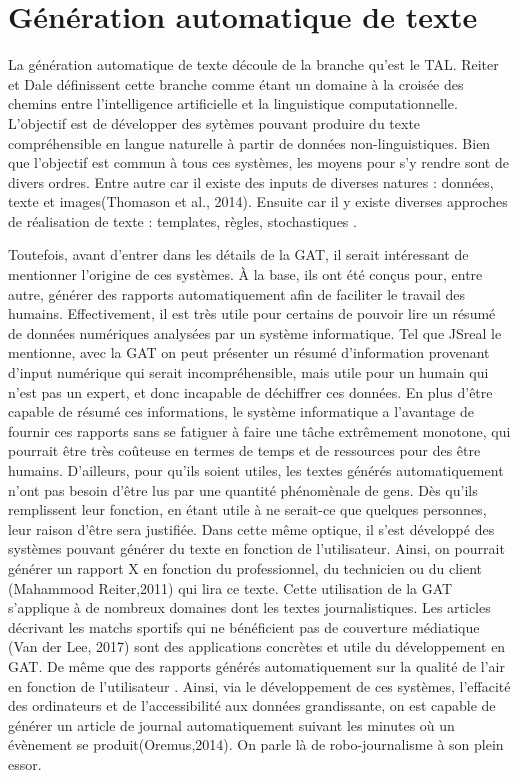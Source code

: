 
\chapter{Génération automatique de texte}

La génération automatique de texte découle de la branche qu'est le \ac{TAL}. Reiter et Dale \citep{ReiterBuildingNaturalLanguage2000} définissent cette branche comme étant un domaine à la croisée des chemins entre l'intelligence artificielle et la linguistique computationnelle. L'objectif est de développer des sytèmes pouvant produire du texte compréhensible en langue naturelle à partir de données non-linguistiques. Bien que l'objectif est commun à tous ces systèmes, les moyens pour s'y rendre sont de divers ordres. Entre autre car il existe des inputs de diverses natures : données, texte et images(Thomason et al., 2014). Ensuite car il y existe diverses approches de réalisation de texte : templates, règles, stochastiques \citep{gatt18}.

Toutefois, avant d'entrer dans les détails de la \ac{GAT}, il serait intéressant de mentionner l'origine de ces systèmes. À la base, ils ont été conçus pour, entre autre, générer des rapports automatiquement afin de faciliter le travail des humains. Effectivement, il est très utile pour certains de pouvoir lire un résumé de données numériques analysées par un système informatique. Tel que JSreal le mentionne, avec la GAT on peut présenter un résumé d'information provenant d'input numérique qui serait incompréhensible, mais utile pour un humain qui n'est pas un expert, et donc incapable de déchiffrer ces données. En plus d'être capable de résumé ces informations, le système informatique a l'avantage de fournir ces rapports sans se fatiguer à faire une tâche extrêmement monotone, qui pourrait être très coûteuse en termes de temps et de ressources pour des être humains.  D'ailleurs, pour qu'ils soient utiles, les textes générés automatiquement n'ont pas besoin d'être lus par une quantité phénomènale de gens. Dès qu'ils remplissent leur fonction, en étant utile à ne serait-ce que quelques personnes, leur raison d'être sera justifiée.  Dans cette même optique, il s'est développé des systèmes pouvant générer du texte en fonction de l'utilisateur. Ainsi, on pourrait générer un rapport X en fonction du professionnel, du technicien ou du client (Mahammood Reiter,2011) qui lira ce texte. Cette utilisation de la \ac{GAT} s'applique à de nombreux domaines dont les textes journalistiques. Les articles décrivant les matchs sportifs qui ne bénéficient pas de couverture médiatique (Van der Lee, 2017) sont des applications concrètes et utile du développement en \ac{GAT}. De même que des rapports générés automatiquement sur la qualité de l'air en fonction de l'utilisateur \citep{WannerMARQUISGENERATIONUSERTAILORED2010}. Ainsi, via le développement de ces systèmes, l'effacité des ordinateurs et de l'accessibilité aux données grandissante, on est capable de générer un article de journal automatiquement suivant les minutes où un évènement se produit(Oremus,2014). On parle là de robo-journalisme à son plein essor.

